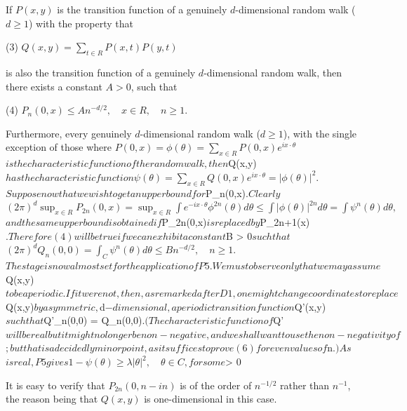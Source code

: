 If $P(x,y)$ is the transition function of a genuinely $d$-dimensional random walk ($d \geq 1$) with the property that

(3) $Q(x,y) = \sum_{t \in R} P(x,t)P(y,t)$

is also the transition function of a genuinely $d$-dimensional random walk, then there exists a constant $A > 0$, such that

(4) $P_n(0,x) \leq An^{-d/2}, \quad x \in R, \quad n \geq 1$.

Furthermore, every genuinely $d$-dimensional random walk ($d \geq 1$), with the single exception of those where $P(0,x) =

$$\phi(\theta) = \sum_{x \in R} P(0,x)e^{ix\cdot\theta}$$

is the characteristic function of the random walk, then $Q(x,y)$ has the characteristic function

$$\psi(\theta) = \sum_{x \in R} Q(0,x)e^{ix\cdot\theta} = |\phi(\theta)|^2.$$

Suppose now that we wish to get an upper bound for $P_n(0,x)$. Clearly

$$(2\pi)^d \sup_{x \in R} P_{2n}(0,x) = \sup_{x \in R} \int e^{-ix\cdot\theta} \phi^{2n}(\theta) d\theta \leq \int |\phi(\theta)|^{2n} d\theta = \int \psi^n(\theta) d\theta,$$

and the same upper bound is obtained if $P_{2n}(0,x)$ is replaced by $P_{2n+1}(x)$. Therefore (4) will be true if we can exhibit a constant $B > 0$ such that

$$(2\pi)^d Q_n(0,0) = \int_C \psi^n(\theta) d\theta \leq Bn^{-d/2}, \quad n \geq 1.$$

The stage is now almost set for the application of P5. We must observe only that we may assume $Q(x,y)$ to be aperiodic. If it were not, then, as remarked after D1, one might change coordinates to replace $Q(x,y)$ by a symmetric, $d$-dimensional, aperiodic transition function $Q'(x,y)$ such that $Q'_n(0,0) = Q_n(0,0)$. (The characteristic function of $Q'$ will be real but it might no longer be non-negative, and we shall want to use the non-negativity of $\psi$; but that is a decidedly minor point, as it suffices to prove (6) for even values of $n$.) As $\psi$ is real, P5 gives

$$1 - \psi(\theta) \geq \lambda|\theta|^2, \quad \theta \in C,$$

for some $\lambda > 0

It is easy to verify that $P_{2n}(0,n - in)$ is of the order of $n^{-1/2}$ rather than $n^{-1}$, the reason being that $Q(x,y)$ is one-dimensional in this case.

